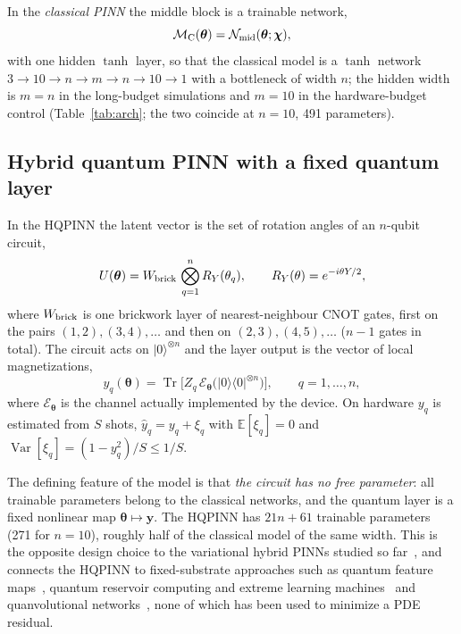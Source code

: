 \documentclass[floatfix,aps,pra,twocolumn,superscriptaddress,10pt,nofootinbib]{revtex4-2}
\begin{document}
In the \emph{classical PINN} the middle block is a trainable network,
\begin{equation}
  \mathcal M_{\rm C}(\bm\theta)=\mathcal N_{\rm mid}(\bm\theta;\bm\chi),
  \label{eq:bottleneck}
\end{equation}
with one hidden $\tanh$ layer, so that the classical model is a $\tanh$ network $3\to10\to n\to m\to n\to10\to1$ with a bottleneck of width $n$; the hidden width is $m=n$ in the long-budget simulations and $m=10$ in the hardware-budget control (Table~\ref{tab:arch}; the two coincide at $n=10$, 491 parameters).

\subsection{Hybrid quantum PINN with a fixed quantum layer}\label{sec:hqpinn}
In the HQPINN the latent vector is the set of rotation angles of an $n$-qubit circuit,
\begin{equation}
  U(\bm\theta)=W_{\rm brick}\,\bigotimes_{q=1}^{n}R_Y(\theta_q),\qquad R_Y(\theta)=e^{-i\theta Y/2},
  \label{eq:circuit}
\end{equation}
where $W_{\rm brick}$ is one brickwork layer of nearest-neighbour CNOT gates, first on the pairs $(1,2),(3,4),\dots$ and then on $(2,3),(4,5),\dots$ ($n-1$ gates in total). The circuit acts on $|0\rangle^{\otimes n}$ and the layer output is the vector of local magnetizations,
\begin{equation}
  y_q(\bm\theta)=\operatorname{Tr}\!\big[Z_q\,\mathcal E_{\bm\theta}\big(|0\rangle\langle0|^{\otimes n}\big)\big],\qquad q=1,\dots,n,
  \label{eq:expval}
\end{equation}
where $\mathcal E_{\bm\theta}$ is the channel actually implemented by the device. On hardware $y_q$ is estimated from $S$ shots, $\hat y_q=y_q+\xi_q$ with $\mathbb E[\xi_q]=0$ and $\operatorname{Var}[\xi_q]=(1-y_q^2)/S\le1/S$.

The defining feature of the model is that \emph{the circuit has no free parameter}: all trainable parameters belong to the classical networks, and the quantum layer is a fixed nonlinear map $\bm\theta\mapsto\bm y$. The HQPINN has $21n+61$ trainable parameters (271 for $n=10$), roughly half of the classical model of the same width. This is the opposite design choice to the variational hybrid PINNs studied so far~\cite{sedykh2024hybrid,berger2025trainable,farea2025qcpinn,lantigua2026classical,zabihi2026hybrid}, and connects the HQPINN to fixed-substrate approaches such as quantum feature maps~\cite{havlicek2019supervised}, quantum reservoir computing and extreme learning machines~\cite{fujii2017harnessing,mujal2021opportunities} and quanvolutional networks~\cite{henderson2020quanvolutional}, none of which has been used to minimize a PDE residual.
\end{document}
